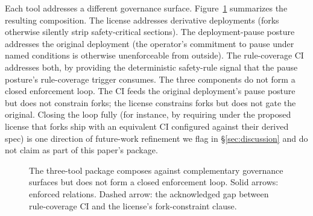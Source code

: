 \documentclass[letterpaper]{article} %
\begin{document}
Each tool addresses a different governance surface. Figure~\ref{fig:composability} summarizes the resulting composition. The license addresses derivative deployments (forks otherwise silently strip safety-critical sections). The deployment-pause posture addresses the original deployment (the operator's commitment to pause under named conditions is otherwise unenforceable from outside). The rule-coverage CI addresses both, by providing the deterministic safety-rule signal that the pause posture's rule-coverage trigger consumes. The three components do not form a closed enforcement loop. The CI feeds the original deployment's pause posture but does not constrain forks; the license constrains forks but does not gate the original. Closing the loop fully (for instance, by requiring under the proposed license that forks ship with an equivalent CI configured against their derived spec) is one direction of future-work refinement we flag in \S\ref{sec:discussion} and do not claim as part of this paper's package.

\begin{figure}[t]
\centering
{}
\caption{The three-tool package composes against complementary governance surfaces but does not form a closed enforcement loop. Solid arrows: enforced relations. Dashed arrow: the acknowledged gap between rule-coverage CI and the license's fork-constraint clause.}
\label{fig:composability}
\end{figure}
\end{document}
